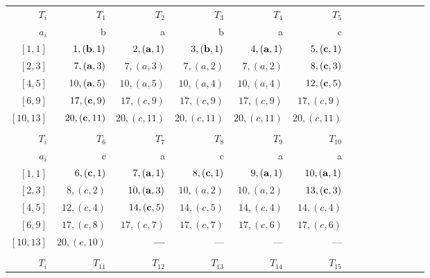 \documentclass{llncs}
\begin{document}
\begin{table}[htb]\label{table of 20}
\begin{center}
\begin{tabular}{|r|r|r|r|r|r|r|r|r|r|r|r|r|r|} \hline
$T_i$    &$T_1$                  &$T_2$                &$T_3$               &$T_4$              &$T_5$             \\
$a_i$    &b                      &a                    &b                   &a                   &c             \\ \hline 
$[1,1]$  &$1,({\bf b},1)$        &$2,({\bf a},1)$      &$3,({\bf b},1)$     &$4,({\bf a},1)$     &$5,({\bf c},1)$ \\ 
$[2,3]$  &$7,({\bf a},3)$        &$7,(a,3)$            &$7,(a,2)$           &$7,(a,2)$           &$8,({\bf c},3)$\\
$[4,5]$  &$10,({\bf a},5)$       &$10,(a,5)$           &$10,(a,4)$          &$10,(a,4)$          &$12,({\bf c},5)$\\
$[6,9]$  &$17,({\bf c},9)$       &$17,(c,9)$           &$17,(c,9)$          &$17,(c,9)$          &$17,(c,9)$  \\ 
$[10,13]$&$20,({\bf c},11)$      &$20,(c,11)$          &$20,(c,11)$         &$20,(c,11)$         &$20,(c,11)$  \\ \hline    
\multicolumn{6}{c}{}\\ \hline
$T_i$     &$T_6$                 &$T_7$                   & $T_8$                 & $T_9$                 &$T_{10}$ \\
$a_i$     &c                   & a                    & c                   & a                   &a  \\ \hline
$[1,1]$   &$6,({\bf c},1)$     &$7,({\bf a},1)$       &$8,({\bf c},1)$      &$9,({\bf a},1)$      &$10,({\bf a},1)$\\
$[2,3]$   &$8,(c,2)$           &$10,({\bf a},3)$      &$10,(a,2)$           &$10,(a,2)$           &$13,({\bf c},3)$\\
$[4,5]$   &$12,(c,4)$          &$14,({\bf c},5)$      &$14,(c,5)$           &$14,(c,4)$           &$14,(c,4)$ \\
$[6,9]$   &$17,(c,8)$          &$17,(c,7)$            &$17,(c,7)$           &$17,(c,6)$           &$17,(c,6)$  \\ 
$[10,13]$ &$20,(c,10)$         &{\bf ---}             &---                  &---                  &--- \\ \hline    
\multicolumn{6}{c}{}\\ \hline
$T_i$    &$T_{11}$                &$T_{12}$                &$T_{13}$                &$T_{14}$                &$T_{15}$ \\ 

\end{tabular}
\end{center}
\end{table}
\end{document}
